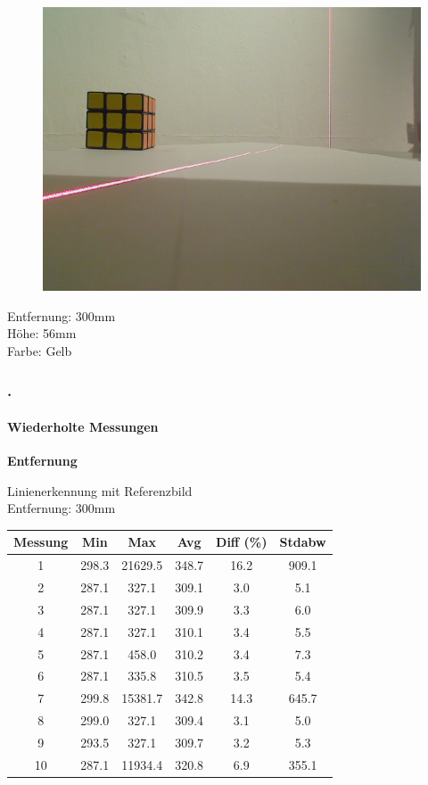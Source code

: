 \documentclass[xcolor=dvipsnames]{beamer}
\def\frametitlesec{\frametitle{\arabic{section}.\hspace{0.5ex}\insertsection}}
\def\framesubtitles#1{\framesubtitle{\hspace{3.5ex}#1}}
\begin{document}
\begin{frame}
\begin{figure}
\begin{minipage}{0.32\linewidth}
		\end{minipage}
		\hfill
		\begin{minipage}{0.32\linewidth}
			\includegraphics[width=\linewidth]{includes/test_repeat_3}
		\end{minipage}
	\end{figure}
	
	Entfernung: 300mm\\
	Höhe: 56mm\\
	Farbe: Gelb

\end{frame}


\begin{frame}
	\frametitlesec
	\framesubtitles{Wiederholte Messungen}

	\textbf{Entfernung}

	Linienerkennung mit Referenzbild\\
	Entfernung: 300mm
	\vfill

	\begin{tabular}{c|c|c|c|c|c}
		Messung & Min & Max & Avg & Diff (\%) & Stdabw \\ \hline
		1 & 298.3 & 21629.5 & 348.7 & 16.2 & 909.1 \\
		2 & 287.1 & 327.1 & 309.1 & 3.0 & 5.1 \\
		3 & 287.1 & 327.1 & 309.9 & 3.3 & 6.0 \\
		4 & 287.1 & 327.1 & 310.1 & 3.4 & 5.5 \\
		5 & 287.1 & 458.0 & 310.2 & 3.4 & 7.3 \\
		6 & 287.1 & 335.8 & 310.5 & 3.5 & 5.4 \\
		7 & 299.8 & 15381.7 & 342.8 & 14.3 & 645.7 \\
		8 & 299.0 & 327.1 & 309.4 & 3.1 & 5.0 \\
		9 & 293.5 & 327.1 & 309.7 & 3.2 & 5.3 \\
		10 & 287.1 & 11934.4 & 320.8 & 6.9 & 355.1
	\end{tabular}

\end{frame}
\end{document}
